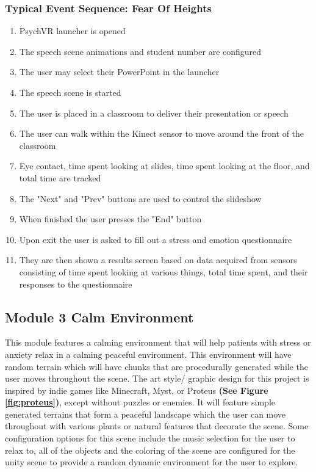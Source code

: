 \documentclass[a4paper,10pt]{article}
\begin{document}
\subsubsection{Typical Event Sequence: Fear Of Heights}
\begin{enumerate}
	\item PsychVR launcher is opened
	\item The speech scene animations and student number are configured
	\item The user may select their PowerPoint in the launcher
	\item The speech scene is started
	\item The user is placed in a classroom to deliver their presentation or speech
	\item The user can walk within the Kinect sensor to move around the front of the classroom
	\item Eye contact, time spent looking at slides, time spent looking at the floor, and total time are tracked
	\item The "Next" and "Prev" buttons are used to control the slideshow
	\item When finished the user presses the "End" button
	\item Upon exit the user is asked to fill out a stress and emotion questionnaire
	\item They are then shown a results screen based on data acquired from sensors consisting of time spent looking at various things, total time spent, and their responses to the questionnaire
\end{enumerate}
\pagebreak
\subsection{Module 3 Calm Environment}
This module features a calming environment that will help patients with stress or anxiety relax in a calming peaceful environment. This environment will have random terrain which will have chunks that are procedurally generated while the user moves throughout the scene.  The art style/ graphic design for this project is inspired by indie games like Minecraft, Myst, or Proteus \textbf{(See Figure \ref{fig:proteus})}, except without puzzles or enemies. It will feature simple generated terrains that form a  peaceful landscape which the user can move throughout with various plants or natural features that decorate the scene.  Some configuration options for this scene include the music selection for the user to relax to, all of the objects and the coloring of the scene are configured for the unity scene to provide a random dynamic environment for the user to explore.
\end{document}
